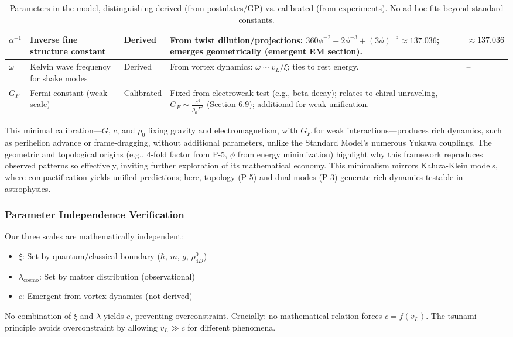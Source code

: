 \begin{table}[H]
\begin{tabularx}{\linewidth}{|p{1.5cm}|p{2cm}|l|X|p{3cm}|}
\hline
$\alpha^{-1}$ & Inverse fine structure constant & Derived & From twist dilution/projections: $360 \phi^{-2} - 2 \phi^{-3} + (3 \phi)^{-5} \approx 137.036$; emerges geometrically (emergent EM section). & $\approx 137.036$ \\
\hline
$\omega$ & Kelvin wave frequency for shake modes & Derived & From vortex dynamics: $\omega \sim v_L / \xi$; ties to rest energy. & -- \\
\hline
$G_F$ & Fermi constant (weak scale) & Calibrated & Fixed from electroweak test (e.g., beta decay); relates to chiral unraveling, $G_F \sim \frac{c^4}{\rho_0 \Gamma^2}$ (Section 6.9); additional for weak unification. & -- \\
\hline
\end{tabularx}
\caption{Parameters in the model, distinguishing derived (from postulates/GP) vs. calibrated (from experiments). No ad-hoc fits beyond standard constants.}
\label{tab:parameters}
\end{table}

This minimal calibration---$G$, $c$, and $\rho_0$ fixing gravity and electromagnetism, with $G_F$ for weak interactions---produces rich dynamics, such as perihelion advance or frame-dragging, without additional parameters, unlike the Standard Model's numerous Yukawa couplings. The geometric and topological origins (e.g., 4-fold factor from P-5, $\phi$ from energy minimization) highlight why this framework reproduces observed patterns so effectively, inviting further exploration of its mathematical economy. This minimalism mirrors Kaluza-Klein models, where compactification yields unified predictions; here, topology (P-5) and dual modes (P-3) generate rich dynamics testable in astrophysics.

\subsubsection{Parameter Independence Verification}

Our three scales are mathematically independent:
\begin{itemize}
\item $\xi$: Set by quantum/classical boundary ($\hbar$, $m$, $g$, $\rho_{4D}^0$)
\item $\lambda_{\text{cosmo}}$: Set by matter distribution (observational)
\item $c$: Emergent from vortex dynamics (not derived)
\end{itemize}

No combination of $\xi$ and $\lambda$ yields $c$, preventing overconstraint. Crucially: no mathematical relation forces $c = f(v_L)$. The tsunami principle avoids overconstraint by allowing $v_L \gg c$ for different phenomena.

